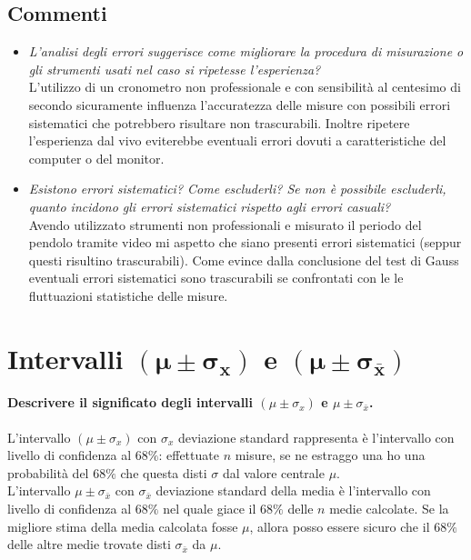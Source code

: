 \documentclass{article}
\begin{document}
	\subsection{Commenti}
	\begin{itemize}
		\item \textit{L'analisi degli errori suggerisce come migliorare la procedura di misurazione o gli strumenti usati nel caso si ripetesse l'esperienza?} \\
		
		\noindent
		L'utilizzo di un cronometro non professionale e con sensibilità al centesimo di secondo sicuramente influenza l'accuratezza delle misure con possibili errori sistematici che potrebbero risultare non trascurabili. Inoltre ripetere l'esperienza dal vivo eviterebbe eventuali errori dovuti a caratteristiche del computer o del monitor.
		
		\item \textit{Esistono errori sistematici? Come escluderli? Se non è possibile escluderli, quanto incidono gli errori sistematici rispetto agli errori casuali?} \\
		
		\noindent
		Avendo utilizzato strumenti non professionali e misurato il periodo del pendolo tramite video mi aspetto che siano presenti errori sistematici (seppur questi risultino trascurabili). Come evince dalla conclusione del test di Gauss eventuali errori sistematici sono trascurabili se confrontati con le le fluttuazioni statistiche delle misure.
	\end{itemize}
	
	\newpage
	\section{Intervalli $\mathbf{(\mu \pm \sigma_x)}$ e $\mathbf{(\mu \pm \sigma_{\bar{x}})}$}
	\paragraph{Descrivere il significato degli intervalli $(\mu \pm \sigma_x)$ e $\mu \pm \sigma_{\bar{x}}$.}  
	L'intervallo $(\mu \pm \sigma_x)$ con $\sigma_x$ deviazione standard rappresenta è l'intervallo con livello di confidenza al $68\%$: effettuate $n$ misure, se ne estraggo una ho una probabilità del $68\%$ che questa disti $\sigma$ dal valore centrale $\mu$.  \\
	
	\noindent
	L'intervallo $\mu \pm \sigma_{\bar{x}}$ con $\sigma_{\bar{x}}$ deviazione standard della media è l'intervallo con livello di confidenza al $68\%$ nel quale giace il $68\%$ delle $n$ medie calcolate. Se la migliore stima della media calcolata fosse $\mu$, allora posso essere sicuro che il $68\%$ delle altre medie trovate disti $\sigma_{\bar{x}}$ da $\mu$. \\ \\
	
\end{document}
